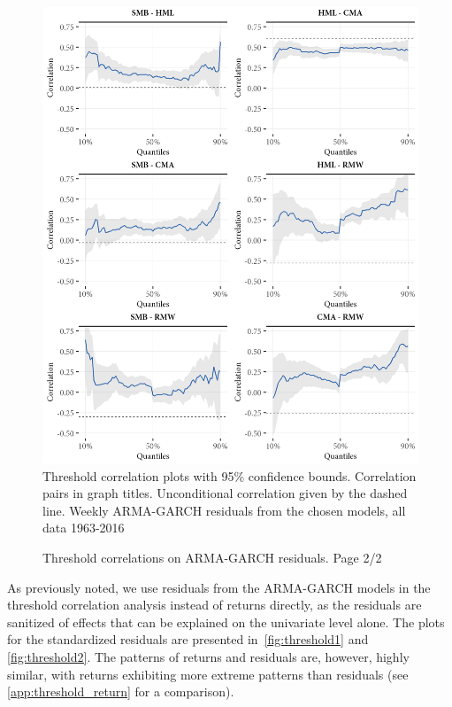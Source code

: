\begin{figure}[htbp]
  \caption{Threshold correlations on ARMA-GARCH residuals. Page 2/2}
  \label{fig:threshold2}
  \centering
  \begin{minipage}{\textwidth}
  \includegraphics[scale=1]{graphics/threshold2.png}  
  \vspace{3mm}
  \footnotesize
  Threshold correlation plots with 95\% confidence bounds. Correlation pairs in graph titles. Unconditional correlation given by the dashed line. Weekly ARMA-GARCH residuals from the chosen models, all data 1963-2016
  \end{minipage}
\end{figure}

As previously noted, we use residuals from the ARMA-GARCH models in the threshold correlation analysis instead of returns directly, as the residuals are sanitized of effects that can be explained on the univariate level alone. The plots for the standardized residuals are presented in~\autoref{fig:threshold1} and \autoref{fig:threshold2}. The patterns of returns and residuals are, however, highly similar, with returns exhibiting more extreme patterns than residuals (see \autoref{app:threshold_return} for a comparison).

